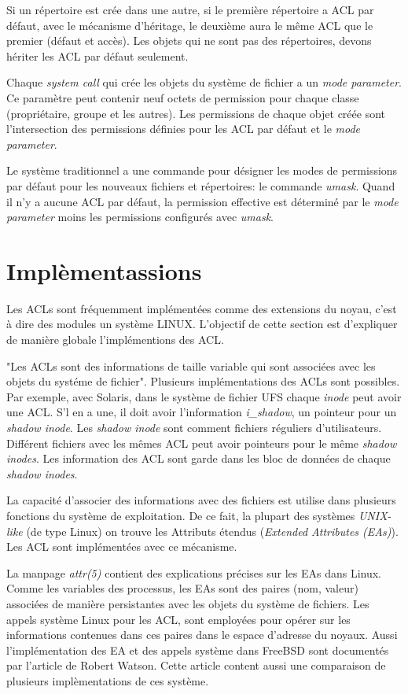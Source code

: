 Si un répertoire est crée dans une autre, si le première répertoire a ACL par défaut, avec le mécanisme d'héritage, le deuxième aura le même ACL que le premier (défaut  et accès). Les objets qui ne sont pas des répertoires, devons hériter les ACL par défaut seulement.
 
Chaque \emph{system call} qui crée les objets du système de fichier a un \emph{mode parameter}. Ce paramètre peut contenir neuf octets de permission pour chaque classe (propriétaire, groupe et les autres). Les permissions de chaque objet créée sont l'intersection des permissions définies pour les ACL par défaut et le \emph{mode parameter}.
 
Le système traditionnel a une commande pour désigner les modes de permissions par défaut pour les nouveaux fichiers et répertoires: le commande \emph{umask}. Quand il n'y a aucune ACL par défaut, la permission effective est déterminé par le \emph{mode parameter} moins les permissions configurés avec \emph{umask}.
 \section{Implèmentassions}
 
Les ACLs sont fréquemment implémentées comme des extensions du noyau, c'est à dire des modules un système LINUX. L'objectif de cette section est d'expliquer de manière globale l'implémentions des ACL. 
 
"Les ACLs sont des informations de taille variable qui sont associées avec les objets du systéme de fichier"\cite{aclsuse}. Plusieurs implémentations des ACLs sont possibles. Par exemple, avec Solaris, dans le système de fichier UFS\cite{acl_permission} chaque \emph{inode} peut avoir une ACL. S'l en a une, il doit avoir l'information \emph{i\_shadow}, un pointeur pour un \emph{shadow inode}. Les \emph{shadow inode} sont comment fichiers réguliers d'utilisateurs. Différent fichiers avec les mêmes ACL peut avoir pointeurs pour le même \emph{shadow inodes}. Les information des ACL sont garde dans les bloc de données de chaque \emph{shadow inodes}.
 
La capacité d'associer des informations avec des fichiers est utilise dans plusieurs fonctions du système de exploitation. De ce fait, la plupart des systèmes \emph{UNIX-like} (de type Linux) on trouve les Attributs étendus (\emph{Extended Attributes (EAs)}). Les ACL sont implémentées avec ce mécanisme.


La manpage \cite{aclsuse} \emph{attr(5)} contient des explications précises sur les EAs dans Linux. Comme les variables des processus, les EAs sont des paires (nom, valeur) associées de manière persistantes avec les objets du système de fichiers. Les appels système Linux pour les ACL, sont employées pour opérer sur les informations contenues dans ces paires dans le espace d'adresse du noyaux. Aussi l'implémentation des EA et des appels système dans FreeBSD sont documentés par l'article de Robert Watson\cite{trust}. Cette article content aussi une comparaison de plusieurs implèmentations de ces système.
 
